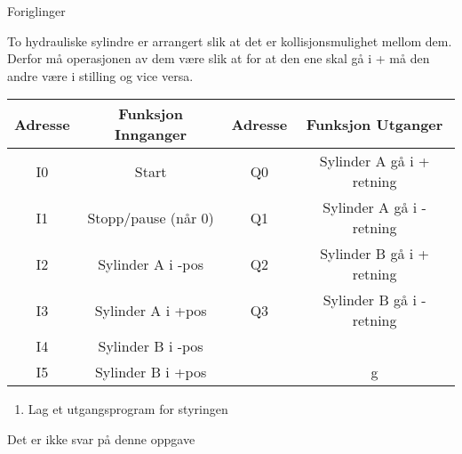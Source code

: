 


Foriglinger

To hydrauliske sylindre er arrangert slik at det er kollisjonsmulighet
mellom dem. Derfor må operasjonen av dem være slik at for at den ene
skal gå i + må den andre være i \textendash stilling og vice versa. 

\begin{tabular}{|c|c|c|c|}
\hline 
Adresse & Funksjon Innganger & Adresse & Funksjon Utganger\tabularnewline
\hline 
\hline 
I0 & Start & Q0 & Sylinder A gå i + retning\tabularnewline
\hline 
I1 & Stopp/pause (når 0) & Q1 & Sylinder A gå i - retning\tabularnewline
\hline 
I2 & Sylinder A i -pos & Q2 & Sylinder B gå i + retning\tabularnewline
\hline 
I3 & Sylinder A i +pos & Q3 & Sylinder B gå i - retning\tabularnewline
\hline 
I4 & Sylinder B i -pos &  & \tabularnewline
\hline 
I5 & Sylinder B i +pos &  & g\tabularnewline
\hline 
\end{tabular}
\begin{enumerate}
\item Lag et utgangsprogram for styringen
\end{enumerate}






Det er ikke svar på denne oppgave












